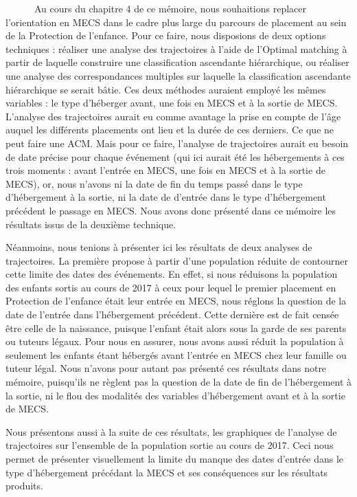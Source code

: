 \documentclass[
  12,
  a4paper,
]{report}
\begin{document}
~~~~~~Au cours du chapitre 4 de ce mémoire, nous souhaitions replacer
l'orientation en MECS dans le cadre plus large du parcours de placement
au sein de la Protection de l'enfance. Pour ce faire, nous disposions de
deux options techniques : réaliser une analyse des trajectoires à l'aide
de l'Optimal matching à partir de laquelle construire une classification
ascendante hiérarchique, ou réaliser une analyse des correspondances
multiples sur laquelle la classification ascendante hiérarchique se
serait bâtie. Ces deux méthodes auraient employé les mêmes variables :
le type d'héberger avant, une fois en MECS et à la sortie de MECS.
L'analyse des trajectoires aurait eu comme avantage la prise en compte
de l'âge auquel les différents placements ont lieu et la durée de ces
derniers. Ce que ne peut faire une ACM. Mais pour ce faire, l'analyse de
trajectoires aurait eu besoin de date précise pour chaque événement (qui
ici aurait été les hébergements à ces trois moments : avant l'entrée en
MECS, une fois en MECS et à la sortie de MECS), or, nous n'avons ni la
date de fin du temps passé dans le type d'hébergement à la sortie, ni la
date de d'entrée dans le type d'hébergement précédent le passage en
MECS. Nous avons donc présenté dans ce mémoire les résultats issus de la
deuxième technique.

Néanmoins, nous tenions à présenter ici les résultats de deux analyses
de trajectoires. La première propose à partir d'une population réduite
de contourner cette limite des dates des événements. En effet, si nous
réduisons la population des enfants sortis au cours de 2017 à ceux pour
lequel le premier placement en Protection de l'enfance était leur entrée
en MECS, nous réglons la question de la date de l'entrée dans
l'hébergement précédent. Cette dernière est de fait censée être celle de
la naissance, puisque l'enfant était alors sous la garde de ses parents
ou tuteurs légaux. Pour nous en assurer, nous avons aussi réduit la
population à seulement les enfants étant hébergés avant l'entrée en MECS
chez leur famille ou tuteur légal. Nous n'avons pour autant pas présenté
ces résultats dans notre mémoire, puisqu'ils ne règlent pas la question
de la date de fin de l'hébergement à la sortie, ni le flou des modalités
des variables d'hébergement avant et à la sortie de MECS.

Nous présentons aussi à la suite de ces résultats, les graphiques de
l'analyse de trajectoires sur l'ensemble de la population sortie au
cours de 2017. Ceci nous permet de présenter visuellement la limite du
manque des dates d'entrée dans le type d'hébergement précédant la MECS
et ses conséquences sur les résultats produits.
\end{document}
